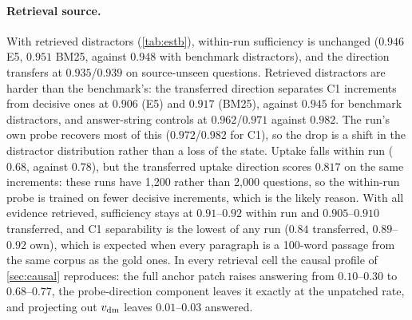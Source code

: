 \paragraph{Retrieval source.} With retrieved distractors (\cref{tab:estb}), within-run sufficiency is unchanged ($0.946$ E5, $0.951$ BM25, against $0.948$ with benchmark distractors), and the \musique{} direction transfers at $0.935$/$0.939$ on source-unseen questions. Retrieved distractors are harder than the benchmark's: the transferred direction separates C1 increments from decisive ones at $0.906$ (E5) and $0.917$ (BM25), against $0.945$ for benchmark distractors, and answer-string controls at $0.962$/$0.971$ against $0.982$. The run's own probe recovers most of this ($0.972$/$0.982$ for C1), so the drop is a shift in the distractor distribution rather than a loss of the state. Uptake falls within run ($0.68$, against $0.78$), but the transferred \musique{} uptake direction scores $0.817$ on the same increments: these runs have 1{,}200 rather than 2{,}000 questions, so the within-run probe is trained on fewer decisive increments, which is the likely reason. With all evidence retrieved, sufficiency stays at $0.91$--$0.92$ within run and $0.905$--$0.910$ transferred, and C1 separability is the lowest of any run ($0.84$ transferred, $0.89$--$0.92$ own), which is expected when every paragraph is a 100-word passage from the same corpus as the gold ones. In every retrieval cell the causal profile of \cref{sec:causal} reproduces: the full anchor patch raises answering from $0.10$--$0.30$ to $0.68$--$0.77$, the probe-direction component leaves it exactly at the unpatched rate, and projecting out $v_{\mathrm{dm}}$ leaves $0.01$--$0.03$ answered.

\begin{table}[t]
\centering\small

\caption{Quality-state separability (\musique{} variants run): AUROC separating each state's increments (negatives) from decisive increments (positives), with the run's own probe (test questions) and with the \musique{} direction (source-unseen questions). Lower values mean the state looks more like completing the evidence.}
\label{tab:estb_quality}
\end{table}

